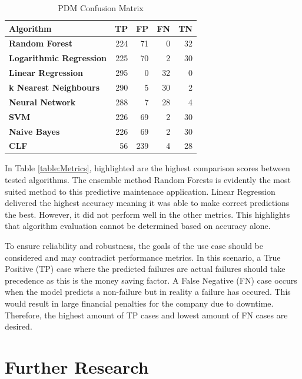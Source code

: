 \documentclass[a4paper,12pt]{report}
\begin{document}
\begin{table}[h]    
    \centering
    \caption{PDM Confusion Matrix}
    \label{table:Conf}
    \begin{tabular}{lrrrr}
        \toprule
        \textbf{Algorithm} &   \textbf{TP} &   \textbf{FP} &  \textbf{FN} &  \textbf{TN} \\
        \midrule
        \textbf{Random Forest} &  224 &   71 &   0 &  32 \\
        \textbf{Logarithmic Regression} &  225 &   70 &   2 &  30 \\
        \textbf{Linear Regression} &  295 &    0 &  32 &   0 \\
        \textbf{k Nearest Neighbours} &  290 &    5 &  30 &   2 \\
        \textbf{Neural Network} &  288 &    7 &  28 &   4 \\
        \textbf{SVM} &  226 &   69 &   2 &  30 \\
        \textbf{Naive Bayes} &  226 &   69 &   2 &  30 \\
        \textbf{CLF} &   56 &  239 &   4 &  28 \\
        \bottomrule
    \end{tabular}
\end{table}

In Table \ref{table:Metrics}, highlighted are the highest comparison scores between tested algorithms.
The ensemble method Random Forests is evidently the most suited method to this predictive maintenace application.
Linear Regression delivered the highest accuracy meaning it was able to make correct predictions the best. 
However, it did not perform well in the other metrics. This highlights that algorithm evaluation cannot be determined based on accuracy alone.

To ensure reliability and robustness, the goals of the use case should be considered and may contradict performance metrics.
In this scenario, a True Positive (TP) case where the predicted failures are actual failures should take precedence as this is the money saving factor. 
A False Negative (FN) case occurs when the model predicts a non-failure but in reality a failure has occured. This would result in large financial penalties for the company due to downtime.
Therefore, the highest amount of TP cases and lowest amount of FN cases are desired.

\section{Further Research}
\end{document}
